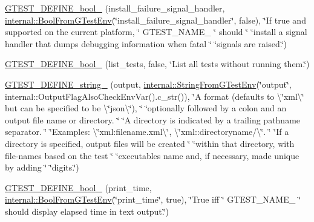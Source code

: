 \begin{DoxyCompactItemize}
\item 
\mbox{\hyperlink{namespacetesting_ad37eab296e354d74a81e2cedc34ac6b8}{G\+T\+E\+S\+T\+\_\+\+D\+E\+F\+I\+N\+E\+\_\+bool\+\_\+}} (install\+\_\+failure\+\_\+signal\+\_\+handler, \mbox{\hyperlink{namespacetesting_1_1internal_a67132cdce23fb71b6c38ee34ef81eb4c}{internal\+::\+Bool\+From\+G\+Test\+Env}}(\char`\"{}install\+\_\+failure\+\_\+signal\+\_\+handler\char`\"{}, false), \char`\"{}If true and supported on the current platform, \char`\"{} G\+T\+E\+S\+T\+\_\+\+N\+A\+M\+E\+\_\+ \char`\"{} should \char`\"{} \char`\"{}install a signal handler that dumps debugging information when fatal \char`\"{} \char`\"{}signals are raised.\char`\"{})
\item 
\mbox{\hyperlink{namespacetesting_a0fa31ecbf33c5e5970cca1d91c050153}{G\+T\+E\+S\+T\+\_\+\+D\+E\+F\+I\+N\+E\+\_\+bool\+\_\+}} (list\+\_\+tests, false, \char`\"{}List all tests without running them.\char`\"{})
\item 
\mbox{\hyperlink{namespacetesting_a540064257c7d8030f84b886bc519aaf8}{G\+T\+E\+S\+T\+\_\+\+D\+E\+F\+I\+N\+E\+\_\+string\+\_\+}} (output, \mbox{\hyperlink{namespacetesting_1_1internal_a7ed785df46a339403b0f749d3a879201}{internal\+::\+String\+From\+G\+Test\+Env}}(\char`\"{}output\char`\"{}, internal\+::\+Output\+Flag\+Also\+Check\+Env\+Var().c\+\_\+str()), \char`\"{}A format (defaults to \textbackslash{}\char`\"{}xml\textbackslash{}\char`\"{} but can be specified to be \textbackslash{}\char`\"{}json\textbackslash{}\char`\"{}), \char`\"{} \char`\"{}optionally followed by a colon and an output file name or directory. \char`\"{} \char`\"{}A directory is indicated by a trailing pathname separator. \char`\"{} \char`\"{}Examples\+: \textbackslash{}\char`\"{}xml\+:filename.\+xml\textbackslash{}\char`\"{}, \textbackslash{}\char`\"{}xml\+::directoryname/\textbackslash{}\char`\"{}. \char`\"{} \char`\"{}If a directory is specified, output files will be created \char`\"{} \char`\"{}within that directory, with file-\/names based on the test \char`\"{} \char`\"{}executable\textquotesingle{}s name and, if necessary, made unique by adding \char`\"{} \char`\"{}digits.\char`\"{})
\item 
\mbox{\hyperlink{namespacetesting_a766fcba2ec951940e528276919a5d22f}{G\+T\+E\+S\+T\+\_\+\+D\+E\+F\+I\+N\+E\+\_\+bool\+\_\+}} (print\+\_\+time, \mbox{\hyperlink{namespacetesting_1_1internal_a67132cdce23fb71b6c38ee34ef81eb4c}{internal\+::\+Bool\+From\+G\+Test\+Env}}(\char`\"{}print\+\_\+time\char`\"{}, true), \char`\"{}True iff \char`\"{} G\+T\+E\+S\+T\+\_\+\+N\+A\+M\+E\+\_\+ \char`\"{} should display elapsed time in text output.\char`\"{})

\end{DoxyCompactItemize}
